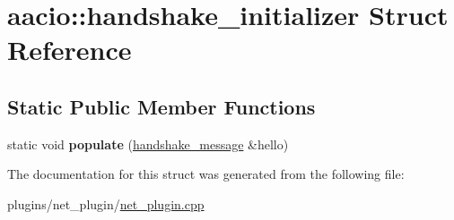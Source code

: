 \hypertarget{structaacio_1_1handshake__initializer}{}\section{aacio\+:\+:handshake\+\_\+initializer Struct Reference}
\label{structaacio_1_1handshake__initializer}
\subsection*{Static Public Member Functions}
\begin{DoxyCompactItemize}
\item 
\mbox{\label{structaacio_1_1handshake__initializer_a4f029ce842eefa892c4f089cea56a726}} 
static void {\bfseries populate} (\mbox{\hyperlink{structaacio_1_1handshake__message}{handshake\+\_\+message}} \&hello)
\end{DoxyCompactItemize}


The documentation for this struct was generated from the following file\+:\begin{DoxyCompactItemize}
\item 
plugins/net\+\_\+plugin/\mbox{\hyperlink{net__plugin_8cpp}{net\+\_\+plugin.\+cpp}}\end{DoxyCompactItemize}
